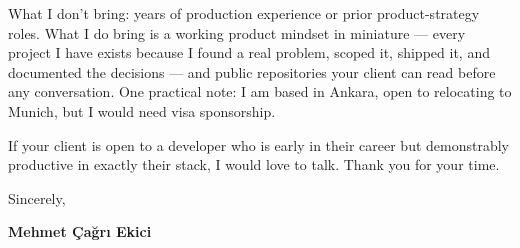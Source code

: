 \documentclass[11pt,a4paper]{article}
\begin{document}
What I don't bring: years of production experience or prior product-strategy roles. What I do bring is a working product mindset in miniature --- every project I have exists because I found a real problem, scoped it, shipped it, and documented the decisions --- and public repositories your client can read before any conversation. One practical note: I am based in Ankara, open to relocating to Munich, but I would need visa sponsorship.

If your client is open to a developer who is early in their career but demonstrably productive in exactly their stack, I would love to talk. Thank you for your time.

Sincerely,

\textbf{Mehmet Çağrı Ekici}
\end{document}
